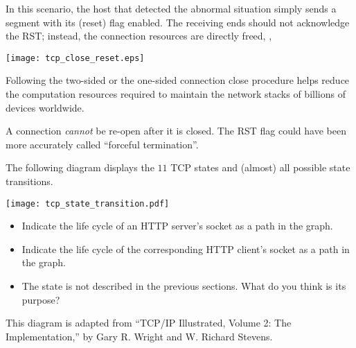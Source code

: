 In this scenario, the host that detected the abnormal situation simply sends a segment 
with its  (reset) flag enabled. The receiving ends should not acknowledge
the RST; instead, the connection resources are directly freed, \eg,

\begin{center}
\texttt{[image: tcp\_close\_reset.eps]} 
\end{center}

Following the two-sided or the one-sided connection close procedure helps reduce the 
computation resources required to maintain the network stacks of billions of devices worldwide.

\begin{remark}
A connection \textit{cannot} be re-open after it is closed. The RST flag could have been 
more accurately called ``forceful termination''.
\end{remark}

\begin{exercise}
The following diagram displays the $11$ TCP states and (almost) 
all possible state transitions.

\begin{center}
 \texttt{[image: tcp\_state\_transition.pdf]}
\end{center}

\begin{itemize}
\item Indicate the life cycle of an HTTP server's socket as a path in the graph.
\item Indicate the life cycle of the corresponding HTTP client's socket as a path in the graph.
\item The  state is not described in the previous sections. 
  What do you think is its purpose?
\end{itemize}

\begin{remark}
 This diagram is adapted from ``TCP/IP Illustrated, Volume 2: The Implementation,''
by Gary R. Wright and W. Richard Stevens.
\end{remark}


\end{exercise}
